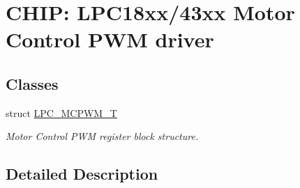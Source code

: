 \hypertarget{group___m_c_p_w_m__18_x_x__43_x_x}{}\section{C\+H\+IP\+: L\+P\+C18xx/43xx Motor Control P\+WM driver}
\label{group___m_c_p_w_m__18_x_x__43_x_x}
\subsection*{Classes}
\begin{DoxyCompactItemize}
\item 
struct \hyperlink{struct_l_p_c___m_c_p_w_m___t}{L\+P\+C\+\_\+\+M\+C\+P\+W\+M\+\_\+T}
\begin{DoxyCompactList}\small\item\em Motor Control P\+WM register block structure. \end{DoxyCompactList}\end{DoxyCompactItemize}


\subsection{Detailed Description}

